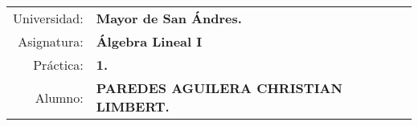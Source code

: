 \begin{tabular}{r l }
Universidad: & \textbf{Mayor de San Ándres.}\\
Asignatura: & \textbf{Álgebra Lineal I}\\
Práctica: & \textbf{1.}\\ 
Alumno: & \textbf{PAREDES AGUILERA CHRISTIAN LIMBERT.}
\end{tabular}
\begin{flushleft}
\end{flushleft}

